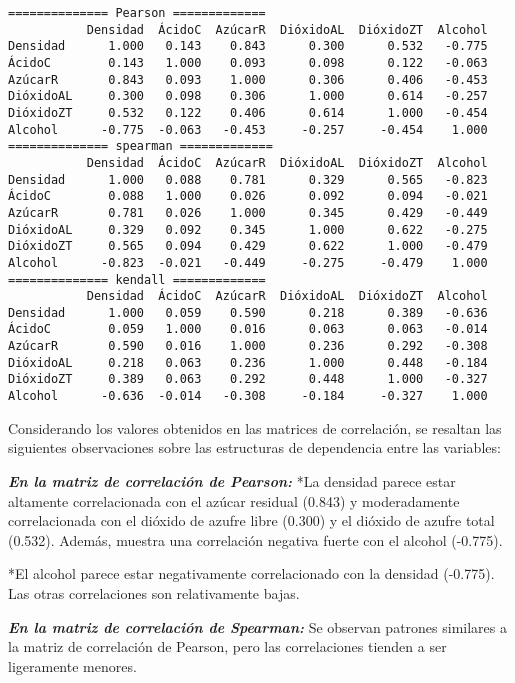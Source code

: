 \documentclass[11pt]{article}
\begin{document}
    \begin{Verbatim}[commandchars=\\\{\}]
============== Pearson =============
           Densidad  ÁcidoC  AzúcarR  DióxidoAL  DióxidoZT  Alcohol
Densidad      1.000   0.143    0.843      0.300      0.532   -0.775
ÁcidoC        0.143   1.000    0.093      0.098      0.122   -0.063
AzúcarR       0.843   0.093    1.000      0.306      0.406   -0.453
DióxidoAL     0.300   0.098    0.306      1.000      0.614   -0.257
DióxidoZT     0.532   0.122    0.406      0.614      1.000   -0.454
Alcohol      -0.775  -0.063   -0.453     -0.257     -0.454    1.000
============== spearman =============
           Densidad  ÁcidoC  AzúcarR  DióxidoAL  DióxidoZT  Alcohol
Densidad      1.000   0.088    0.781      0.329      0.565   -0.823
ÁcidoC        0.088   1.000    0.026      0.092      0.094   -0.021
AzúcarR       0.781   0.026    1.000      0.345      0.429   -0.449
DióxidoAL     0.329   0.092    0.345      1.000      0.622   -0.275
DióxidoZT     0.565   0.094    0.429      0.622      1.000   -0.479
Alcohol      -0.823  -0.021   -0.449     -0.275     -0.479    1.000
============== kendall =============
           Densidad  ÁcidoC  AzúcarR  DióxidoAL  DióxidoZT  Alcohol
Densidad      1.000   0.059    0.590      0.218      0.389   -0.636
ÁcidoC        0.059   1.000    0.016      0.063      0.063   -0.014
AzúcarR       0.590   0.016    1.000      0.236      0.292   -0.308
DióxidoAL     0.218   0.063    0.236      1.000      0.448   -0.184
DióxidoZT     0.389   0.063    0.292      0.448      1.000   -0.327
Alcohol      -0.636  -0.014   -0.308     -0.184     -0.327    1.000
    \end{Verbatim}

    Considerando los valores obtenidos en las matrices de correlación, se
resaltan las siguientes observaciones sobre las estructuras de
dependencia entre las variables:

\textbf{\emph{En la matriz de correlación de Pearson:}} *La densidad
parece estar altamente correlacionada con el azúcar residual (0.843) y
moderadamente correlacionada con el dióxido de azufre libre (0.300) y el
dióxido de azufre total (0.532). Además, muestra una correlación
negativa fuerte con el alcohol (-0.775).

*El alcohol parece estar negativamente correlacionado con la densidad
(-0.775). Las otras correlaciones son relativamente bajas.

\textbf{\emph{En la matriz de correlación de Spearman:}} Se observan
patrones similares a la matriz de correlación de Pearson, pero las
correlaciones tienden a ser ligeramente menores.
\end{document}
